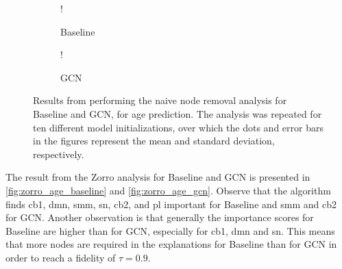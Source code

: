 \begin{figure}[!htbp]
    \centering
        \begin{subfigure}{.5\textwidth}
            \centering
            \begin{center}
                \resizebox {1.0\linewidth} {!} {
                    
                }
            \end{center}
            \caption{Baseline}
            \label{fig:naive_age_baseline}
        \end{subfigure}%
        \begin{subfigure}{.5\textwidth}
            \centering
            \begin{center}
                \resizebox {1.0\linewidth} {!} {
                    
                }
            \end{center}
            \caption{GCN}
            \label{fig:naive_age_gcn}
        \end{subfigure}
    \caption{Results from performing the naive node removal analysis for Baseline and GCN, for age prediction. The analysis was repeated for ten different model initializations, over which the dots and error bars in the figures represent the mean and standard deviation, respectively.}
    \label{fig:naive_age}
\end{figure}

The result from the Zorro analysis for Baseline and GCN is presented in \cref{fig:zorro_age_baseline} and \cref{fig:zorro_age_gcn}. Observe that the algorithm finds \acrshort{cb1}, \acrshort{dmn}, \acrshort{smm}, \acrshort{sn}, \acrshort{cb2}, and \acrshort{pl} important for Baseline and \acrshort{smm} and \acrshort{cb2} for GCN. Another observation is that generally the importance scores for Baseline are higher than for GCN, especially for \acrshort{cb1}, \acrshort{dmn} and \acrshort{sn}. This means that more nodes are required in the explanations for Baseline than for GCN in order to reach a fidelity of $\tau=0.9$.

